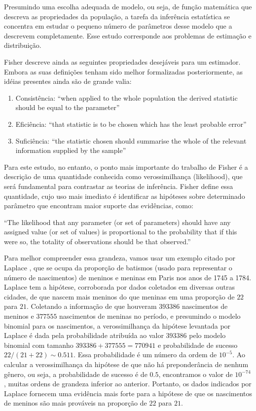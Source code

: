 Presumindo uma escolha adequada de modelo, ou seja,	de função matemática que descreva as propriedades da população,
a tarefa da inferência estatística se concentra em estudar o pequeno número de parâmetros desse modelo que a descrevem
completamente. Esse estudo corresponde aos problemas de estimação e distribuição.

Fisher descreve ainda as seguintes propriedades desejáveis para um estimador. Embora as suas definições tenham sido
melhor formalizadas posteriormente, as idéias presentes ainda são de grande valia:
\begin{enumerate}
	\item Consistência: ``when applied to the whole population the derived statistic should be equal to the parameter''
	\item Eficiência: ``that statistic is to be chosen which has the least probable error''
	\item Suficiência: ``the statistic chosen should summarise the whole of the relevant information supplied by the sample''
\end{enumerate}

Para este estudo, no entanto, o ponto mais importante do trabalho de Fisher é a descrição de uma quantidade conhecida como
verossimilhança (likelihood), que será fundamental para contrastar as teorias de inferência. Fisher define essa quantidade,
cujo uso mais imediato é identificar as hipóteses sobre determinado parâmetro que encontram maior suporte das evidências,
como:

``The likelihood that any parameter (or set of parameters) should have
any assigned value (or set of values) is proportional to the probability
that if this were so, the totality of observations should be that observed.''\citep{Fisher1922}

Para melhor compreender essa grandeza, vamos usar um exemplo citado por Laplace \citep{Laplace1814}, que se ocupa da 
proporção de batismos (usado para representar o número de nascimentos) de meninos e meninas em Paris nos anos 
de 1745 a 1784. Laplace tem a hipótese, corroborada por dados coletados em diversas outras cidades, de que nascem mais meninos
do que meninas em uma proporção de $22$ para $21$. Coletando a informação de que houveram $393386$ nascimentos de 
meninos e $377555$
nascimentos de meninas no período, e presumindo o modelo binomial para os nascimentos, a verossimilhança da hipótese levantada
por Laplace é dada pela probabilidade atribuída ao valor $393386$ pelo modelo binomial com tamanho $393386 + 377555 = 770941$
e probabilidade de sucesso $22/(21+22) \sim 0.511$. Essa probabilidade é um número da ordem de $10^{-5}$. Ao calcular a 
verossimilhança da hipótese de que não há preponderância de nenhum gênero, ou seja, a probabilidade de sucesso é de $0.5$, 
encontramos o valor de $10^{-74}$, muitas ordens de grandeza inferior ao anterior. Portanto, os dados indicados por Laplace
fornecem uma evidência mais forte para a hipótese de que os nascimentos de meninos são mais prováveis na proporção de $22$
para $21$.


